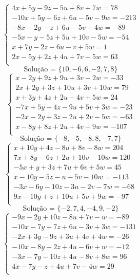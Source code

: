 \documentclass[12pt,oneside,a4paper]{article}
\begin{document}
\vspace{\baselineskip}
\begin{equation*}
\begin{cases}
4x+5y-9z-5u+8v+7w=78 \\
-10x+5y+6z+6u-5v-9w=-213 \\
-8x-2y-z+6u-5v+4w=-89 \\
-5x-y-5z+5u+10v-5w=-54 \\
x+7y-2z-6u-v+5w=1 \\
2x-5y+2z+4u+7v-5w=63 \\
\end{cases}
\end{equation*}
\begin{equation*}
\text{Solução = }\{10,-6,6,-2,7,8\}
\end{equation*}
\vspace{\baselineskip}
\begin{equation*}
\begin{cases}
x-2y+9z+9u+3v-2w=-33 \\
2x+2y+3z+10u+3v+10w=79 \\
x+3y+4z+2u-4v+5w=24 \\
-7x+5y-4z-9u+5v+3w=-23 \\
-2x-2y+3z-2u+2v-5w=-63 \\
x-8y+8z+2u+4v-9w=-107 \\
\end{cases}
\end{equation*}
\begin{equation*}
\text{Solução = }\{-8,-5,-8,8,-7,7\}
\end{equation*}
\vspace{\baselineskip}
\begin{equation*}
\begin{cases}
x+10y+4z-8u+8v-8w=204 \\
7x+8y-6z+2u+10v-10w=120 \\
-5x+y+3z+7u+6v+5w=45 \\
x-10y-5z-u-5v-10w=-113 \\
-3x-6y-10z-3u-2v-7w=-68 \\
9x-10y+z+10u+5v+9w=-97 \\
\end{cases}
\end{equation*}
\begin{equation*}
\text{Solução = }\{-2,7,4,-4,9,-2\}
\end{equation*}
\vspace{\baselineskip}
\begin{equation*}
\begin{cases}
-9x-2y+10z-8u+7v-w=-89 \\
-10x-7y+7z+6u-3v+3w=-131 \\
-2x+3y-9z+3u+4v+4w=-26 \\
-10x-8y-2z+4u-6v+w=-12 \\
-3x-7y-10z+4u-8v+8w=96 \\
4x-7y-z+4u+7v-4w=29 \\
\end{cases}
\end{equation*}
\end{document}
